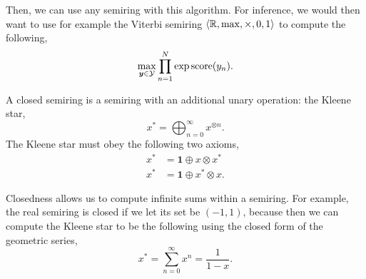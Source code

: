 Then, we can use any semiring with this algorithm. For inference, we would then
want to use for example the Viterbi semiring $\langle \mathbb{R}, \max, \times, 0, 1
\rangle$ to compute the following, \[
  \max_{\bm{y}\in\mathcal{Y}} \prod_{n=1}^N \exp \mathrm{score}(y_n)
.\]

\begin{definition}
  A closed semiring is a semiring with an additional unary operation: the
  Kleene star, \[
    x^* = \bigoplus_{n=0}^\infty x^{\otimes n}
  .\]
  The Kleene star must obey the following two axioms,
  \begin{align*}
    x^* &= \bm{1} \oplus x \otimes x^* \\
    x^* &= \bm{1} \oplus x^* \otimes x
  .\end{align*}
\end{definition}

Closedness allows us to compute infinite sums within a semiring. For example,
the real semiring is closed if we let its set be $(-1,1)$, because then we can
compute the Kleene star to be the following using the closed form of the
geometric series, \[
  x^* = \sum_{n=0}^\infty x^n = \frac{1}{1-x}
.\]
